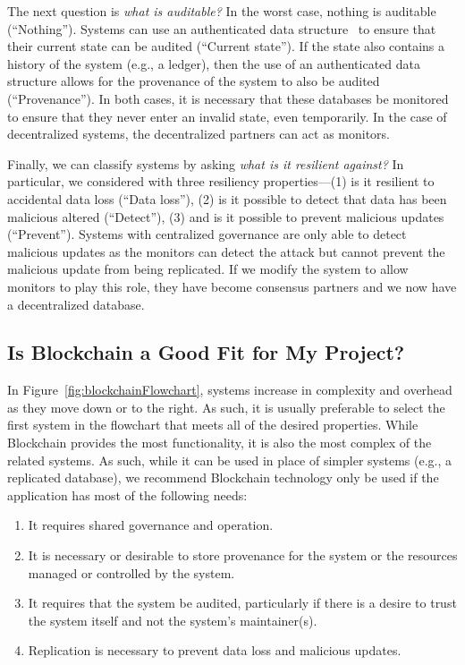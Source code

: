 The next question is \emph{what is auditable?}
In the worst case, nothing is auditable (``Nothing'').
Systems can use an authenticated data structure~\cite{tamassia2003authenticated} to ensure that their current state can be audited (``Current state'').
If the state also contains a history of the system (e.g., a ledger), then the use of an authenticated data structure allows for the provenance of the system to also be audited (``Provenance'').
In both cases, it is necessary that these databases be monitored to ensure that they never enter an invalid state, even temporarily.
In the case of decentralized systems, the decentralized partners can act as monitors.

Finally, we can classify systems by asking \emph{what is it resilient against?}
In particular, we considered with three resiliency properties---(1) is it resilient to accidental data loss (``Data loss''), (2) is it possible to detect that data has been malicious altered (``Detect''), (3) and is it possible to prevent malicious updates (``Prevent'').
Systems with centralized governance are only able to detect malicious updates as the monitors can detect the attack but cannot prevent the malicious update from being replicated.
If we modify the system to allow monitors to play this role, they have become consensus partners and we now have a decentralized database.

\subsection{Is Blockchain a Good Fit for My Project?}
In Figure~\ref{fig:blockchainFlowchart}, systems increase in complexity and overhead as they move down or to the right.
As such, it is usually preferable to select the first system in the flowchart that meets all of the desired properties.
While Blockchain provides the most functionality, it is also the most complex of the related systems.
As such, while it can be used in place of simpler systems (e.g., a replicated database), we recommend Blockchain technology only be used if the application has most of the following needs:

\begin{enumerate}
	\item It requires shared governance and operation.
	\item It is necessary or desirable to store provenance for the system or the resources managed or controlled by the system.
	\item It requires that the system be audited, particularly if there is a desire to trust the system itself and not the system's maintainer(s).
	\item Replication is necessary to prevent data loss and malicious updates.
\end{enumerate}

